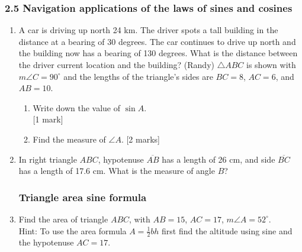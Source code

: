 \documentclass[12pt, twoside]{article}
\begin{document}
\subsubsection*{2.5 Navigation applications of the laws of sines and cosines}

\begin{enumerate}

  \item 
  A car is driving up north 24 km. The driver spots a tall building in the distance at a bearing of 30 degrees. The car continues to drive up north and the building now has a bearing of 130 degrees. What is the distance between the driver current location and the building? (Randy)
  $\triangle ABC$ is shown with $m\angle C=90^\circ$ and the lengths of the triangle's sides are $BC=8$, $AC=6$, and $AB=10$.
  \begin{multicols}{2}
        \begin{enumerate}
        \item Write down the value of $\sin A$.  \\ \hfill [1 mark]\vspace{2cm}
        \item Find the measure of $\angle A$.  \hfill [2 marks] \vspace{1cm}
      \end{enumerate}
    \end{multicols}

\newpage
   \item In right triangle $ABC$, hypotenuse $\overline{AB}$ has a length of 26 cm, and side $\overline{BC}$ has a length of 17.6 cm. What is the measure of angle $B$?

\newpage
\subsubsection*{Triangle area sine formula}
   \item Find the area of triangle $ABC$, with $AB=15$, $AC=17$, $m\angle A = 52^\circ$. \\[0.5cm]
   Hint: To use the area formula $A = \frac{1}{2} bh$ first find the altitude using sine and the hypotenuse $AC=17$.
   \begin{flushleft}
\end{flushleft}
\end{enumerate}
\end{document}
